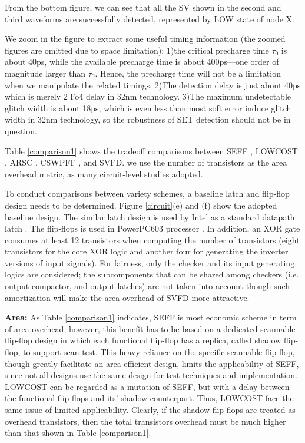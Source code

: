 From the bottom figure, we can see that all the SV shown in the second and third waveforms are successfully detected, represented by LOW state of node X.

We zoom in the figure to extract some useful timing information (the zoomed figures are omitted due to space limitation): 1)the critical precharge time $\tau_0$ is about 40ps, while the available precharge time is about 400ps---one order of magnitude larger than $\tau_0$. Hence, the precharge time will not be a limitation when we manipulate the related timings. 2)The detection delay is just about 40ps which is merely 2 Fo4 delay in 32nm technology. 3)The maximum undetectable glitch width is about 18ps, which is even less than most soft error induce glitch width in 32nm technology, so the robustness of SET detection should not be in question.

Table \ref{comparison1} shows the tradeoff comparisons between SEFF \cite{Mitra_C05}, LOWCOST \cite{lowcost_date07}, ARSC \cite{agarwal2007circuit}, CSWPFF \cite{CWSP_DATE08}, and SVFD. we use the number of transistors as the area overhead metric, as many circuit-level studies adopted.

To conduct comparisons between variety schemes, a baseline latch and flip-flop design needs to be determined. Figure \ref{circuit}(e) and (f) show the adopted baseline design. The similar latch design is used by Intel as a standard datapath latch \cite{Latch_01}. The flip-flops is used in PowerPC603 processor \cite{Flipflop_94}. In addition, an XOR gate consumes at least 12 transistors when computing the number of transistors (eight transistors for the core XOR logic and another four for generating the inverter versions of input signals). For fairness, only the checker and its input generating logics are considered; the subcomponents that can be shared among checkers (i.e. output compactor, and output latches) are not taken into account though such amortization will make the area overhead of SVFD more attractive.

{\bf Area:} As Table \ref{comparison1} indicates, SEFF is most economic scheme in term of area overhead; however, this benefit has to be based on a dedicated scannable flip-flop design in which each functional flip-flop has a replica, called shadow flip-flop,  to support scan test. This heavy reliance on the specific scannable flip-flop, though greatly facilitate an area-efficient design, limits the applicability of SEFF, since not all designs use the same design-for-test techniques and implementation. LOWCOST can be regarded as a mutation of SEFF, but with a delay between the functional flip-flops and its' shadow counterpart. Thus, LOWCOST face the same issue of limited applicability. Clearly, if the shadow flip-flops are treated as overhead transistors, then the total transistors overhead must be much higher than that shown in Table \ref{comparison1}.

